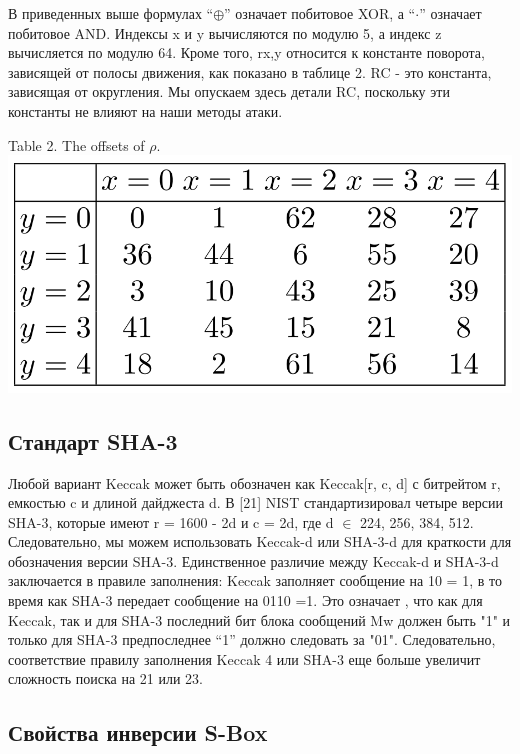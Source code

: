 \documentclass[utf8,14pt,a4paper,oneside,russian]{book}
\begin{document}
В приведенных выше формулах “$\oplus$” означает побитовое XOR, а “$\cdot$” означает побитовое AND.
Индексы x и y вычисляются по модулю 5, а индекс z вычисляется по модулю 64.
Кроме того, rx,y относится к константе поворота, зависящей от полосы движения, как показано в таблице 2.
RC - это константа, зависящая от округления. Мы опускаем здесь детали RC, поскольку эти
константы не влияют на наши методы атаки.

\begin{center}
    Table 2. The offsets of $\rho$.
    \includegraphics*[scale=0.5]{5}\\
\end{center}

\subsection*{Стандарт SHA-3}

Любой вариант Keccak может быть обозначен как Keccak[r, c, d] с битрейтом r, емкостью c
и длиной дайджеста d. В [21] NIST стандартизировал четыре версии SHA-3, которые имеют
r = 1600 - 2d и c = 2d, где d $\in$ {224, 256, 384, 512}. Следовательно, мы можем использовать
Keccak-d или SHA-3-d для краткости для обозначения версии SHA-3.
Единственное различие между Keccak-d и SHA-3-d заключается в правиле заполнения: Keccak
заполняет сообщение на 10 = 1, в то время как SHA-3 передает сообщение на 0110 =1. Это означает
, что как для Keccak, так и для SHA-3 последний бит блока сообщений Mw должен быть "1" и
только для SHA-3 предпоследнее “1” должно следовать за "01". Следовательно, соответствие
правилу заполнения Keccak 4 или SHA-3 еще больше увеличит сложность поиска на 21 или 23.

\subsection*{Свойства инверсии S-Box}
\end{document}

